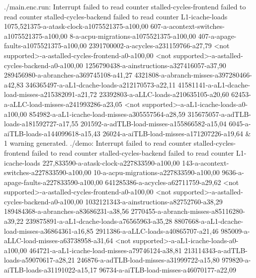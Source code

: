 ./main.enc.run: Interrupt failed to read counter stalled-cycles-frontend failed to read counter stalled-cycles-backend failed to read counter L1-icache-loads 1075,521375-a-atask-clock-a1075521375-a100,00 607-a-acontext-switches-a1075521375-a100,00 8-a-acpu-migrations-a1075521375-a100,00 407-a-apage-faults-a1075521375-a100,00 2391700002-a-acycles-a231159766-a27,79 <not supported>-a-astalled-cycles-frontend-a0-a100,00 <not supported>-a-astalled-cycles-backend-a0-a100,00 1256790438-a-ainstructions-a327416057-a37,90 289456980-a-abranches-a369745108-a41,27 4321808-a-abranch-misses-a397280466-a42,83 346365497-a-aL1-dcache-loads-a212170573-a22,11 41581141-a-aL1-dcache-load-misses-a215382091-a21,72 23392803-a-aLLC-loads-a210635105-a20,60 62453-a-aLLC-load-misses-a241993286-a23,05 <not supported>-a-aL1-icache-loads-a0-a100,00 854982-a-aL1-icache-load-misses-a305557564-a28,59 315675057-a-adTLB-loads-a181592727-a17,55 201592-a-adTLB-load-misses-a155866582-a15,04 6045-a-aiTLB-loads-a144099618-a15,43 26024-a-aiTLB-load-misses-a171207226-a19,64
&
1 warning generated. ./demo: Interrupt failed to read counter stalled-cycles-frontend failed to read counter stalled-cycles-backend failed to read counter L1-icache-loads 227,833590-a-atask-clock-a227833590-a100,00 143-a-acontext-switches-a227833590-a100,00 10-a-acpu-migrations-a227833590-a100,00 9636-a-apage-faults-a227833590-a100,00 641285386-a-acycles-a62711759-a29,62 <not supported>-a-astalled-cycles-frontend-a0-a100,00 <not supported>-a-astalled-cycles-backend-a0-a100,00 1032121343-a-ainstructions-a82752760-a38,29 189484368-a-abranches-a83686231-a38,56 2770455-a-abranch-misses-a85116280-a39,22 239875891-a-aL1-dcache-loads-a76565963-a35,28 8807668-a-aL1-dcache-load-misses-a36864361-a16,85 2911386-a-aLLC-loads-a40865707-a21,46 985009-a-aLLC-load-misses-a63738958-a31,64 <not supported>-a-aL1-icache-loads-a0-a100,00 464721-a-aL1-icache-load-misses-a79746124-a38,81 213114343-a-adTLB-loads-a59070617-a28,21 246876-a-adTLB-load-misses-a31999722-a15,80 979820-a-aiTLB-loads-a31191022-a15,17 96734-a-aiTLB-load-misses-a46070177-a22,09
